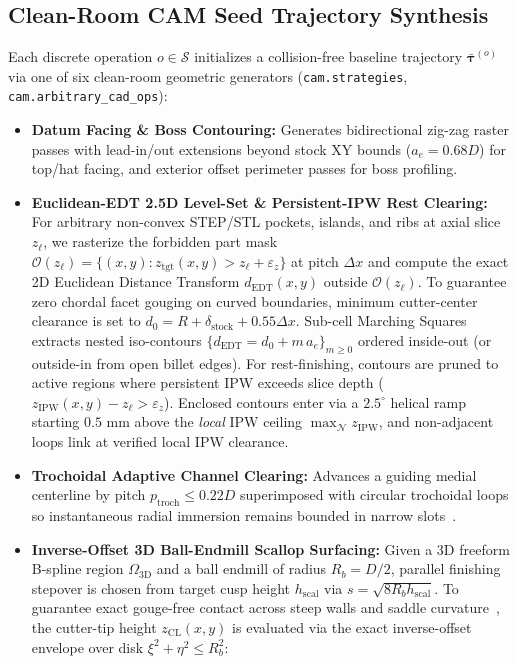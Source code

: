 \documentclass[conference]{IEEEtran}
\begin{document}
\subsection{Clean-Room CAM Seed Trajectory Synthesis}
\label{sec:cam_seeds}
Each discrete operation $o \in \mathcal{S}$ initializes a collision-free baseline trajectory $\bar{\boldsymbol{\tau}}^{(o)}$ via one of six clean-room geometric generators (\texttt{cam.strategies}, \texttt{cam.arbitrary\_\allowbreak cad\_\allowbreak ops}):
\begin{itemize}
  \item \textbf{Datum Facing \& Boss Contouring:} Generates bidirectional zig-zag raster passes with lead-in/out extensions beyond stock XY bounds ($a_e = 0.68 D$) for top/hat facing, and exterior offset perimeter passes for boss profiling.
  \item \textbf{Euclidean-EDT 2.5D Level-Set \& Persistent-IPW Rest Clearing:} For arbitrary non-convex STEP/STL pockets, islands, and ribs at axial slice $z_\ell$, we rasterize the forbidden part mask $\mathcal{O}(z_\ell) = \{(x,y) : z_{\text{tgt}}(x,y) > z_\ell + \varepsilon_z\}$ at pitch $\Delta x$ and compute the exact 2D Euclidean Distance Transform $d_{\text{EDT}}(x,y)$ outside $\mathcal{O}(z_\ell)$. To guarantee zero chordal facet gouging on curved boundaries, minimum cutter-center clearance is set to $d_0 = R + \delta_{\text{stock}} + 0.55\Delta x$. Sub-cell Marching Squares extracts nested iso-contours $\{d_{\text{EDT}} = d_0 + m\,a_e\}_{m \ge 0}$ ordered inside-out (or outside-in from open billet edges). For rest-finishing, contours are pruned to active regions where persistent IPW exceeds slice depth ($z_{\text{IPW}}(x,y) - z_\ell > \varepsilon_z$). Enclosed contours enter via a $2.5^\circ$ helical ramp starting $0.5\text{ mm}$ above the \emph{local} IPW ceiling $\max_{\mathcal{N}} z_{\text{IPW}}$, and non-adjacent loops link at verified local IPW clearance.
  \item \textbf{Trochoidal Adaptive Channel Clearing:} Advances a guiding medial centerline by pitch $p_{\text{troch}} \le 0.22 D$ superimposed with circular trochoidal loops so instantaneous radial immersion remains bounded in narrow slots~\cite{rauch2009trochoidal}.
  \item \textbf{Inverse-Offset 3D Ball-Endmill Scallop Surfacing:} Given a 3D freeform B-spline region $\Omega_{\text{3D}}$ and a ball endmill of radius $R_b = D/2$, parallel finishing stepover is chosen from target cusp height $h_{\text{scal}}$ via $s = \sqrt{8 R_b h_{\text{scal}}}$. To guarantee exact gouge-free contact across steep walls and saddle curvature~\cite{choi1998sculptured}, the cutter-tip height $z_{\text{CL}}(x,y)$ is evaluated via the exact inverse-offset envelope over disk $\xi^2 + \eta^2 \le R_b^2$:

\end{itemize}
\end{document}
